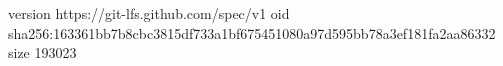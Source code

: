 version https://git-lfs.github.com/spec/v1
oid sha256:163361bb7b8cbc3815df733a1bf675451080a97d595bb78a3ef181fa2aa86332
size 193023
